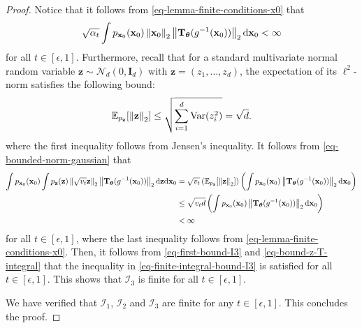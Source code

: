 \begin{proof}
Notice that it follows from  \eqref{eq-lemma-finite-conditions-x0} that
\begin{equation}
\label{eq-first-bound-I3}
\sqrt{\alpha_t}\int p_{\mathbf{x}_{0}}(\mathbf{x}_{0})\left\lVert \mathbf{x}_{0} \right\rVert_2\left\lVert \mathbf{T}_{\boldsymbol{\theta}}(g^{-1}(\mathbf{x}_0)) \right\rVert_2 \mathrm{d}\mathbf{x}_{0} <\infty
\end{equation}
for all $t\in[\epsilon,1]$. Furthermore, recall that for a standard multivariate normal random variable $\mathbf{z}\sim\mathcal{N}_{d}(0,\mathbf{I}_{d})$ with $\mathbf{z} = (z_{1},\ldots,z_{d})$, the expectation of its $\ell^{2}$-norm satisfies the following bound:
\begin{equation}
\label{eq-bounded-norm-gaussian}
\mathbb{E}_{p_{\mathbf{z}}}[\left\lVert \mathbf{z} \right\rVert_2] \leq \sqrt{\sum_{i=1}^{d}\text{Var}(z_{i}^{2})} =\sqrt{d}.
\end{equation}
where the first inequality follows from Jensen's inequality.
It follows from \eqref{eq-bounded-norm-gaussian}  that
\begin{equation}
\label{eq-bound-z-T-integral}
\begin{aligned}
\int p_{\mathbf{x}_0}(\mathbf{x}_0)\int  p_{\mathbf{z}}(\mathbf{z}) \left\lVert \sqrt{v_t} \mathbf{z} \right\rVert_2\left\lVert \mathbf{T}_{\boldsymbol{\theta}}(g^{-1}(\mathbf{x}_0)) \right\rVert_2  \mathrm{d}\mathbf{z} \mathrm{d}\mathbf{x}_0  &= \sqrt{v_{t}}\left(\mathbb{E}_{p_{\mathbf{z}}}[\left\lVert \mathbf{z} \right\rVert_2] \right) \left(\int p_{\mathbf{x}_0}(\mathbf{x}_0)\left\lVert \mathbf{T}_{\boldsymbol{\theta}}(g^{-1}(\mathbf{x}_0)) \right\rVert_2\mathrm{d}\mathbf{x}_0 \right) 
\\ &\leq \sqrt{v_{t}d}  \left(\int p_{\mathbf{x}_0}(\mathbf{x}_0)\left\lVert \mathbf{T}_{\boldsymbol{\theta}}(g^{-1}(\mathbf{x}_0)) \right\rVert_2\mathrm{d}\mathbf{x}_0 \right) 
\\ &<\infty
\end{aligned}
\end{equation}
for all $t\in[\epsilon,1]$, where the last inequality follows from \eqref{eq-lemma-finite-conditions-x0}. Then, it follows from \eqref{eq-first-bound-I3} and \eqref{eq-bound-z-T-integral} that the inequality in \eqref{eq-finite-integral-bound-I3} is satisfied for all $t\in[\epsilon,1]$. This shows that $\mathcal{I}_{3}$ is finite for all $t\in[\epsilon,1]$.



We have verified that $\mathcal{I}_{1}$, $\mathcal{I}_{2}$ and $\mathcal{I}_{3}$ are finite for any $t\in[\epsilon,1]$. This concludes the proof.
\end{proof}

